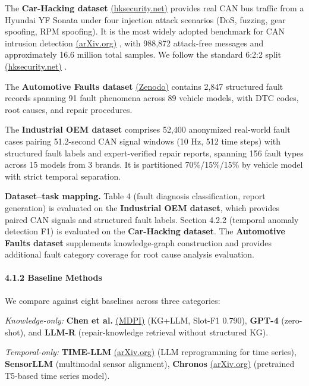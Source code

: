 \documentclass[
  11pt,
]{article}
\begin{document}
The \textbf{Car-Hacking dataset}
\href{https://ocslab.hksecurity.net/Datasets/car-hacking-dataset}{(hksecurity.net)}
provides real CAN bus traffic from a Hyundai YF Sonata under four
injection attack scenarios (DoS, fuzzing, gear spoofing, RPM spoofing).
It is the most widely adopted benchmark for CAN intrusion detection
\href{https://arxiv.org/html/2408.17235}{(arXiv.org)} , with 988,872
attack-free messages and approximately 16.6 million total samples. We
follow the standard 6:2:2 split
\href{https://ocslab.hksecurity.net/Datasets/car-hacking-dataset}{(hksecurity.net)}
.

The \textbf{Automotive Faults dataset}
\href{https://zenodo.org/records/15626055}{(Zenodo)} contains 2,847
structured fault records spanning 91 fault phenomena across 89 vehicle
models, with DTC codes, root causes, and repair procedures.

The \textbf{Industrial OEM dataset} comprises 52,400 anonymized
real-world fault cases pairing 51.2-second CAN signal windows (10 Hz,
512 time steps) with structured fault labels and expert-verified repair
reports, spanning 156 fault types across 15 models from 3 brands. It is
partitioned 70\%/15\%/15\% by vehicle model with strict temporal
separation.

\textbf{Dataset--task mapping.} Table 4 (fault diagnosis classification,
report generation) is evaluated on the \textbf{Industrial OEM dataset},
which provides paired CAN signals and structured fault labels. Section
4.2.2 (temporal anomaly detection F1) is evaluated on the
\textbf{Car-Hacking dataset}. The \textbf{Automotive Faults dataset}
supplements knowledge-graph construction and provides additional fault
category coverage for root cause analysis evaluation.

\paragraph{4.1.2 Baseline Methods}\label{baseline-methods}

We compare against eight baselines across three categories:

\emph{Knowledge-only:} \textbf{Chen et al.}
\href{https://www.mdpi.com/2079-9292/14/21/4180}{(MDPI)} (KG+LLM,
Slot-F1 0.790), \textbf{GPT-4} (zero-shot), and \textbf{LLM-R}
(repair-knowledge retrieval without structured KG).

\emph{Temporal-only:} \textbf{TIME-LLM}
\href{https://arxiv.org/pdf/2310.01728}{(arXiv.org)} (LLM reprogramming
for time series), \textbf{SensorLLM} (multimodal sensor alignment),
\textbf{Chronos} \href{https://arxiv.org/abs/2403.07815}{(arXiv.org)}
(pretrained T5-based time series model).
\end{document}
